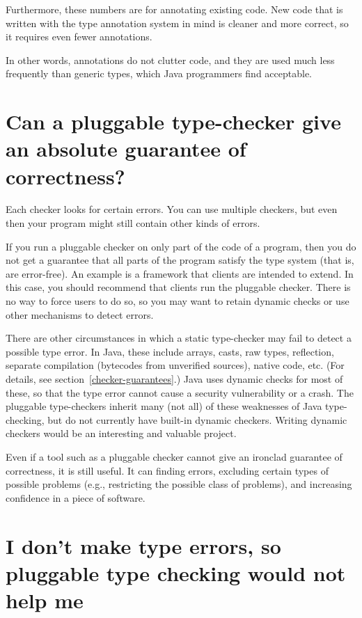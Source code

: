 Furthermore, these numbers are for annotating existing code.  New code that
is written with the type annotation system in mind is cleaner and more
correct, so it requires even fewer annotations.

In other words, annotations do not clutter code, and they are used much
less frequently than generic types, which Java programmers find acceptable.


\section{Can a pluggable type-checker give an absolute guarantee of correctness?\label{faq-no-absolute-guarantee}}

Each checker looks for certain errors.  You can use multiple checkers, but
even then your program might still contain other kinds of errors.

If you run a pluggable checker on only part of the code of a program, then
you do not get a guarantee that all parts of the program satisfy the type
system (that is, are error-free).  An example is a framework that clients
are intended to extend.  In this case, you should recommend that clients
run the pluggable checker.  There is no way to force users to do so, so you
may want to retain dynamic checks or use other mechanisms to detect errors.

There are other circumstances in which a static type-checker may fail to
detect a possible type error.  In Java, these include arrays, casts, raw
types, reflection, separate compilation (bytecodes from unverified sources),
native code, etc.  (For details, see section~\ref{checker-guarantees}.)
Java uses dynamic checks for most of these, so that the
type error cannot cause a security vulnerability or a crash.  The pluggable
type-checkers inherit many (not all) of these weaknesses of Java
type-checking, but do not currently have built-in dynamic checkers.
Writing dynamic checkers would be an interesting and valuable project.


Even if a tool such as a pluggable checker cannot give an ironclad
guarantee of correctness, it is still useful.  It can finding errors, 
excluding certain types of possible problems (e.g., restricting the
possible class of problems), and increasing confidence in a piece of
software.


\section{I don't make type errors, so pluggable type checking would not help me\label{never-make-type-errors}}

